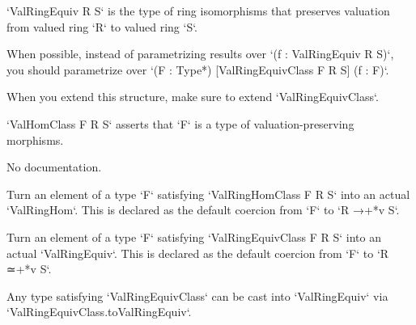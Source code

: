 \begin{definition}\label{ValRingEquiv}
        \leanok
                `ValRingEquiv R S` is the type of ring isomorphisms that preserves valuation from valued ring `R` to valued ring `S`.

When possible, instead of parametrizing results over `(f : ValRingEquiv R S)`,
you should parametrize over `(F : Type*) [ValRingEquivClass F R S] (f : F)`.

When you extend this structure, make sure to extend `ValRingEquivClass`.
    \end{definition}

\begin{definition}\label{ValRingHomClass}
        \leanok
                `ValHomClass F R S` asserts that `F` is a type of valuation-preserving morphisms.
    \end{definition}

\begin{definition}\label{ValRingEquivClass}
        \leanok
                No documentation.
    \end{definition}

\begin{definition}\label{ValRingHomClass.toValRingHom}
        \leanok
                Turn an element of a type `F` satisfying `ValRingHomClass F R S` into an actual
`ValRingHom`. This is declared as the default coercion from `F` to `R →+*v S`.
    \end{definition}

\begin{definition}\label{ValRingEquivClass.toValRingEquiv}
        \leanok
                Turn an element of a type `F` satisfying `ValRingEquivClass F R S` into an actual
`ValRingEquiv`. This is declared as the default coercion from `F` to `R ≃+*v S`.
    \end{definition}

\begin{theorem}\label{ValAlgebra.val_map_le_iff}
        \leanok
                Any type satisfying `ValRingEquivClass` can be cast into `ValRingEquiv` via
`ValRingEquivClass.toValRingEquiv`.
    \end{theorem}

